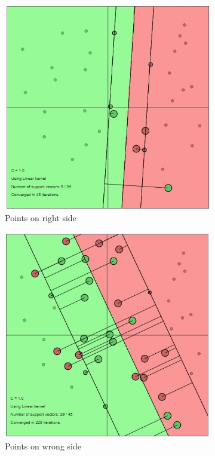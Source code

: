 {	  \begin{figure}[ht] 
	  	\centering
	  	\begin{subfigure}{.3\textwidth}
	  		\centering
	  		\includegraphics[width=.7\linewidth]{Exercise1/Report/linear_kernel_1.jpg}
	  		\caption{Points on right side}
	  		\label{fig:lin1}
	  	\end{subfigure}%
  		\begin{subfigure}{.3\textwidth}
  			\centering
  			\includegraphics[width=.7\linewidth]{Exercise1/Report/linear_kernel_2.jpg}
  			\caption{Points on wrong side}
  			\label{fig:lin2}
  		\end{subfigure}%
  		\begin{subfigure}{.3\textwidth}
  			\centering

\end{subfigure}
\end{figure}}
